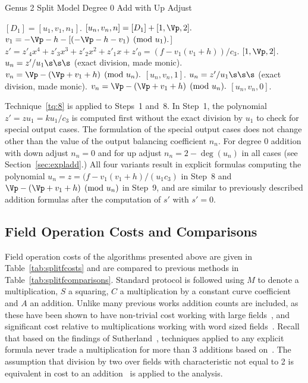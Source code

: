 \begin{algorithm}[htbp]
\caption{Genus 2 Split Model Degree 0 Add with Up Adjust\label{alg:explSPLIT0ADDUP}}
\begin{algorithmic} [1]
\Require $[D_1] = [u_1, v_1, n_1]$. \smallskip
\Ensure $[u_n,v_n,n] = [D_1] + [1,\Vp,2].$
\algrule
\setcounter{ALG@line}{-1}
\State $v_1 =  -\Vp - h - [(-\Vp - h - v_1) \pmod{u_1}.$]
\State $z' = z'_4x^4 + z'_3x^3 + z'_2x^2 + z'_1x + z'_0 = (f - v_1(v_1 + h))/c_3$.
     \Return $[1, \Vp,2]$.
    \Else \hspace{4pt}
        \State $u_n = z'/u_1 \s\s\s$ (exact division, made monic).
        \State $v_n =  \Vp - (\Vp + v_1 + h) \pmod{u_n}.$
        \State \Return $[u_n,v_n,1]$.
    \EndIf
\EndIf
\State $u_n = z'/u_1 \s\s\s$ (exact division, made monic).
\State $v_n =  \Vp - (\Vp + v_1 + h) \pmod{u_n}.$
\State \Return $[u_n,v_n,0]$.
\end{algorithmic}
\end{algorithm}

Technique~\ref{tq:8} is applied to Steps~1 and~8. In Step~1, the polynomial $z'
= zu_1 = ku_1/c_3$ is computed first without the exact division by $u_1$ to
check for special output cases. The formulation of the special output cases
does not change other than the value of the output balancing coefficient $n_n$.
For degree 0 addition with down adjust $n_n = 0$ and for up adjust $n_n = 2 -
\deg(u_n)$ in all cases (see Section~\ref{sec:expladd}.) All four variants
result in explicit formulas computing the polynomial $u_n = z = (f-v_1(v_1 +
h)/(u_1c_3)$ in Step~8 and $\Vp - (\Vp + v_1 + h) \pmod{u_n}$ in Step~9, and are
similar to previously described addition formulas after the computation of $s'$
with $s' = 0$.

\subsection{Field Operation Costs and Comparisons}
\label{sec:splitFieldCosts}
Field operation costs of the algorithms presented above are given in
Table~\ref{tab:splitfcosts} and are compared to previous methods in
Table~\ref{tab:splitfcomparisons}. Standard protocol is followed using $M$ to
denote a multiplication, $S$ a squaring, $C$ a multiplication by a constant
curve coefficient and $A$ an addition. Unlike many previous works addition
counts are included, as these have been shown to have non-trivial cost working
with large fields~\cite{HisilCostello_jaccoord_2014}, and significant cost
relative to multiplications working with word sized
fields~\cite{Sutherland_sato_2016}. Recall that based on the findings of
Sutherland~\cite{Sutherland_sato_2016,Sutherland_g3_2019}, techniques applied to
any explicit formula never trade a multiplication for more than 3 additions
based on~\cite{Sutherland_sato_2016}. The assumption that division by two over
fields with characteristic not equal to 2 is equivalent in cost to an
addition~\cite{Sutherland_g3_2019} is applied to the analysis. 


